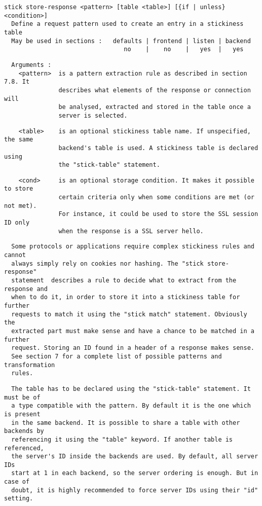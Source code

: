 \begin{verbatim}
stick store-response <pattern> [table <table>] [{if | unless} <condition>]
  Define a request pattern used to create an entry in a stickiness table
  May be used in sections :   defaults | frontend | listen | backend
                                 no    |    no    |   yes  |   yes
\end{verbatim}

\begin{verbatim}
  Arguments :
    <pattern>  is a pattern extraction rule as described in section 7.8. It
               describes what elements of the response or connection will
               be analysed, extracted and stored in the table once a
               server is selected.
\end{verbatim}

\begin{verbatim}
    <table>    is an optional stickiness table name. If unspecified, the same
               backend's table is used. A stickiness table is declared using
               the "stick-table" statement.
\end{verbatim}

\begin{verbatim}
    <cond>     is an optional storage condition. It makes it possible to store
               certain criteria only when some conditions are met (or not met).
               For instance, it could be used to store the SSL session ID only
               when the response is a SSL server hello.
\end{verbatim}

\begin{verbatim}
  Some protocols or applications require complex stickiness rules and cannot
  always simply rely on cookies nor hashing. The "stick store-response"
  statement  describes a rule to decide what to extract from the response and
  when to do it, in order to store it into a stickiness table for further
  requests to match it using the "stick match" statement. Obviously the
  extracted part must make sense and have a chance to be matched in a further
  request. Storing an ID found in a header of a response makes sense. 
  See section 7 for a complete list of possible patterns and transformation
  rules.
\end{verbatim}

\begin{verbatim}
  The table has to be declared using the "stick-table" statement. It must be of
  a type compatible with the pattern. By default it is the one which is present
  in the same backend. It is possible to share a table with other backends by
  referencing it using the "table" keyword. If another table is referenced,
  the server's ID inside the backends are used. By default, all server IDs
  start at 1 in each backend, so the server ordering is enough. But in case of
  doubt, it is highly recommended to force server IDs using their "id" setting.
\end{verbatim}

